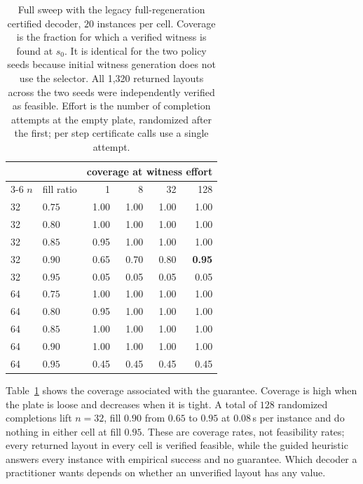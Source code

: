 \documentclass[preprint,12pt,authoryear]{elsarticle}
\newif\iflegacydetails
\begin{document}
\begin{table}[t]
\centering
\caption{Full sweep with the legacy full-regeneration certified decoder, $20$ instances per cell. Coverage is the
fraction for which a verified witness is found at $s_0$. It is identical for the
two policy seeds because initial witness generation does not use the selector.
All 1,320 returned layouts across the two seeds were independently verified as
feasible. Effort is the number of completion attempts at the empty plate,
randomized after the first; per step certificate calls use a single attempt.}
\label{tab:coverage}
\small
\begin{tabular}{@{}llrrrr@{}}
\toprule
& & \multicolumn{4}{c}{coverage at witness effort} \\
\cmidrule(lr){3-6}
$n$ & fill ratio & 1 & 8 & 32 & 128 \\
\midrule
32 & $0.75$ & 1.00 & 1.00 & 1.00 & 1.00 \\
32 & $0.80$ & 1.00 & 1.00 & 1.00 & 1.00 \\
32 & $0.85$ & 0.95 & 1.00 & 1.00 & 1.00 \\
32 & $0.90$ & 0.65 & 0.70 & 0.80 & \textbf{0.95} \\
32 & $0.95$ & 0.05 & 0.05 & 0.05 & 0.05 \\
\midrule
64 & $0.75$ & 1.00 & 1.00 & 1.00 & 1.00 \\
64 & $0.80$ & 0.95 & 1.00 & 1.00 & 1.00 \\
64 & $0.85$ & 1.00 & 1.00 & 1.00 & 1.00 \\
64 & $0.90$ & 1.00 & 1.00 & 1.00 & 1.00 \\
64 & $0.95$ & 0.45 & 0.45 & 0.45 & 0.45 \\
\bottomrule
\end{tabular}
\end{table}

Table~\ref{tab:coverage} shows the coverage associated with the guarantee.
Coverage is high when the plate is loose and decreases when it is tight. A total
of $128$ randomized completions
lift $n=32$, fill $0.90$ from $0.65$ to $0.95$ at $0.08$\,s per instance and
do nothing in either cell at fill $0.95$. These are coverage rates, not
feasibility rates; every returned layout in every cell is verified feasible,
while the guided heuristic answers every instance with empirical success and
no guarantee. Which decoder a practitioner wants depends on whether an
unverified layout has any value.

\iflegacydetails
\end{document}
